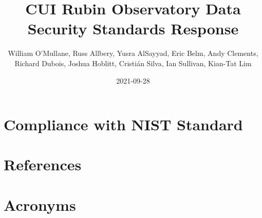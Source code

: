 \documentclass[DM,lsstdraft,authoryear,toc]{lsstdoc}
\title{CUI Rubin Observatory Data Security Standards  Response}
\author{%
William O'Mullane,
Russ Allbery,
Yusra AlSayyad,
Eric Belm,
Andy Clements,
Richard Dubois,
Joshua Hoblitt,
Cristi\'{a}n Silva,
Ian Sullivan,
Kian-Tat Lim
}
\date{2021-09-28}
\begin{document}
\maketitle


\newpage
\appendix

\section{Compliance with NIST Standard}\label{sec:compliance}


\newpage
\section{References} \label{sec:bib}
\renewcommand{\refname}{} %


\section{Acronyms} \label{sec:acronyms}

\end{document}
